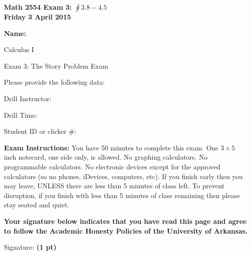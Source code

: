 \documentclass[12pt,letterpaper]{article}
\begin{document}
\flushleft
\begin{multicols}{2}
\textbf{Math 2554 Exam 3: $\oint 3.8-4.5$ \\
Friday 3 April 2015}

\textbf{Name:  }\underline{\hspace{45ex}} %

\vspace{.5in}

\end{multicols}

\pagestyle{empty}

\flushleft

\begin{center}\LARGE Calculus I 

Exam 3: The Story Problem Exam \end{center}

\vspace{1.5pc}
Please provide the following data:

\vspace{1.5pc}
Drill Instructor: \underline{\hspace{40ex}}

\vspace{1.5pc}
Drill Time: \underline{\hspace{40ex}}

\vspace{1.5pc}
Student ID or clicker \#: \underline{\hspace{40ex}}

\vspace{3pc}
{\bf Exam Instructions:} You have 50 minutes to complete this exam.  One $3\times 5$ inch notecard, one side only, is allowed.  No graphing calculators.  No programmable calculators.  No electronic devices except for the approved calculators (so no phones, iDevices, computers, etc).  If you finish early then you may leave, UNLESS there are less than 5 minutes of class left.  To prevent disruption, if you finish with less than 5 minutes of class remaining then please stay seated and quiet.

\vfill
\textbf{Your signature below indicates that you have read this page and agree to follow the Academic Honesty Policies of the University of Arkansas.}  

\vspace{2pc}
Signature: {\bf (1 pt)} \underline{\hspace{91ex}}
\end{document}
